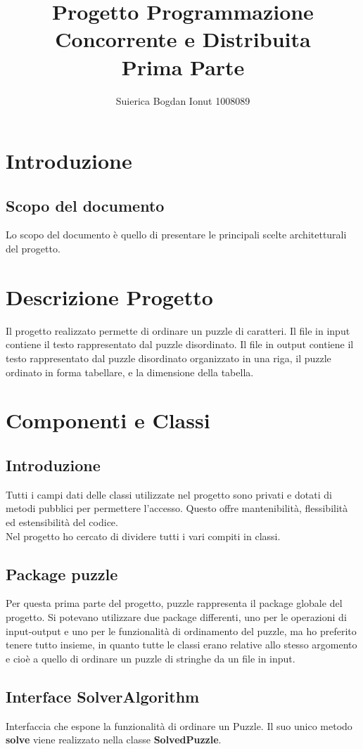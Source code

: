 \documentclass[11pt]{article}
\title{Progetto Programmazione Concorrente e Distribuita\\Prima Parte}
\author{Suierica Bogdan Ionut 1008089}
\begin{document}
\maketitle
\section{Introduzione}
\subsection{Scopo del documento}
Lo scopo del documento è quello di presentare le principali scelte architetturali del progetto.
\section{Descrizione Progetto}
Il progetto realizzato permette di ordinare un puzzle di caratteri.  Il file in input contiene il testo rappresentato dal puzzle disordinato. Il file in output contiene il testo rappresentato dal puzzle disordinato organizzato in una riga, il puzzle ordinato in forma tabellare, e la dimensione della tabella. 
\section{Componenti e Classi}
\subsection{Introduzione}
Tutti i campi dati delle classi utilizzate nel progetto sono privati e dotati di metodi pubblici per permettere l'accesso. Questo offre mantenibilità, flessibilità ed estensibilità del codice.\\
Nel progetto ho cercato di dividere tutti i vari compiti in classi.
\subsection{Package puzzle}
Per questa prima parte del progetto, puzzle rappresenta il package globale del progetto. Si potevano utilizzare due package differenti, uno per le operazioni di input-output e uno per le funzionalità di ordinamento del puzzle, ma ho preferito tenere tutto insieme, in quanto  tutte le classi erano relative allo stesso argomento e cioè a quello di ordinare un puzzle di stringhe da un file in input.
\subsection{Interface SolverAlgorithm}
Interfaccia che espone la funzionalità di ordinare un Puzzle. Il suo unico metodo \textbf{solve} viene realizzato nella classe \textbf{SolvedPuzzle}.
\end{document}

